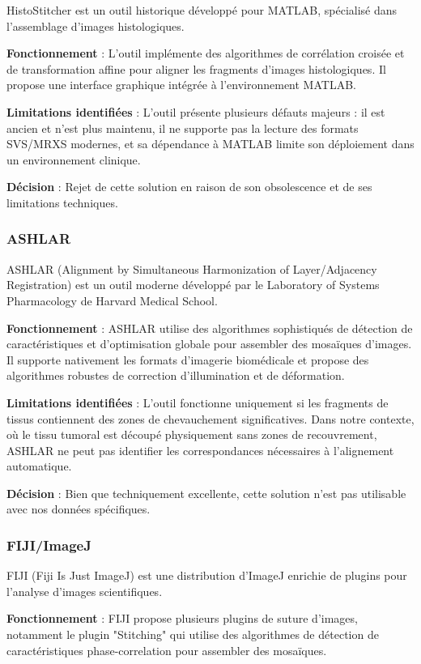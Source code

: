 \documentclass[12pt,a4paper]{report}
\begin{document}
HistoStitcher est un outil historique développé pour MATLAB, spécialisé dans l'assemblage d'images histologiques.

\textbf{Fonctionnement} : L'outil implémente des algorithmes de corrélation croisée et de transformation affine pour aligner les fragments d'images histologiques. Il propose une interface graphique intégrée à l'environnement MATLAB.

\textbf{Limitations identifiées} : L'outil présente plusieurs défauts majeurs : il est ancien et n'est plus maintenu, il ne supporte pas la lecture des formats SVS/MRXS modernes, et sa dépendance à MATLAB limite son déploiement dans un environnement clinique.

\textbf{Décision} : Rejet de cette solution en raison de son obsolescence et de ses limitations techniques.

\subsubsection{ASHLAR}

ASHLAR (Alignment by Simultaneous Harmonization of Layer/Adjacency Registration) est un outil moderne développé par le Laboratory of Systems Pharmacology de Harvard Medical School.

\textbf{Fonctionnement} : ASHLAR utilise des algorithmes sophistiqués de détection de caractéristiques et d'optimisation globale pour assembler des mosaïques d'images. Il supporte nativement les formats d'imagerie biomédicale et propose des algorithmes robustes de correction d'illumination et de déformation.

\textbf{Limitations identifiées} : L'outil fonctionne uniquement si les fragments de tissus contiennent des zones de chevauchement significatives. Dans notre contexte, où le tissu tumoral est découpé physiquement sans zones de recouvrement, ASHLAR ne peut pas identifier les correspondances nécessaires à l'alignement automatique.

\textbf{Décision} : Bien que techniquement excellente, cette solution n'est pas utilisable avec nos données spécifiques.

\subsubsection{FIJI/ImageJ}

FIJI (Fiji Is Just ImageJ) est une distribution d'ImageJ enrichie de plugins pour l'analyse d'images scientifiques.

\textbf{Fonctionnement} : FIJI propose plusieurs plugins de suture d'images, notamment le plugin "Stitching" qui utilise des algorithmes de détection de caractéristiques phase-correlation pour assembler des mosaïques.
\end{document}
